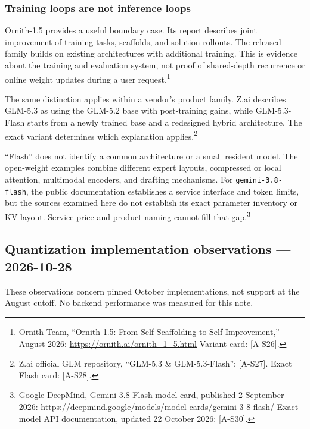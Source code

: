 \subsubsection*{Training loops are not inference
loops}\label{training-loops-are-not-inference-loops}

Ornith-1.5 provides a useful boundary case. Its report describes joint
improvement of training tasks, scaffolds, and solution rollouts. The
released family builds on existing architectures with additional
training. This is evidence about the training and evaluation system, not
proof of shared-depth recurrence or online weight updates during a user
request.\footnote{Ornith Team, ``Ornith-1.5: From Self-Scaffolding to
  Self-Improvement,'' August 2026: \url{https://ornith.ai/ornith_1_5.html}
  Variant card: \mbox{{[}A-S26{]}}.}

The same distinction applies within a vendor's product family. Z.ai
describes GLM-5.3 as using the GLM-5.2 base with post-training gains,
while GLM-5.3-Flash starts from a newly trained base and a redesigned
hybrid architecture. The exact variant determines which explanation
applies.\footnote{Z.ai official GLM repository, ``GLM-5.3 \&
  GLM-5.3-Flash'': \mbox{{[}A-S27{]}}. Exact Flash card: \mbox{{[}A-S28{]}}.}

``Flash'' does not identify a common architecture or a small resident
model. The open-weight examples combine different expert layouts,
compressed or local attention, multimodal encoders, and drafting
mechanisms. For \texttt{gemini-3.8-flash}, the public documentation
establishes a service interface and token limits, but the sources
examined here do not establish its exact parameter inventory or KV
layout. Service price and product naming cannot fill that
gap.\footnote{Google DeepMind, Gemini 3.8 Flash model card, published 2
  September 2026:
  \url{https://deepmind.google/models/model-cards/gemini-3-8-flash/}
  Exact-model API documentation, updated 22 October 2026: \mbox{{[}A-S30{]}}.}

\subsection*{Quantization implementation observations ---
2026-10-28}\label{quantization-implementation-observations-2026-10-28}

These observations concern pinned October implementations, not support
at the August cutoff. No backend performance was measured for this note.

